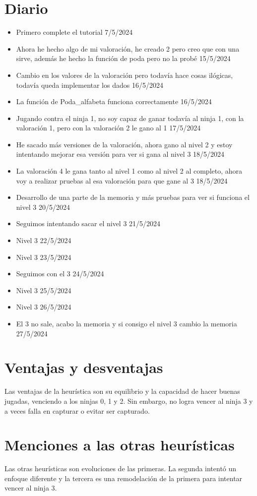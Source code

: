 \documentclass[a4paper, 11pt]{article}
\begin{document}
\section{Diario}

\begin{itemize}
  \item Primero complete el tutorial 7/5/2024
  \item Ahora he hecho algo de mi valoración, he creado 2 pero creo que con una sirve, además he hecho la función de poda pero no la probé 15/5/2024
  \item Cambio en los valores de la valoración pero todavía hace cosas ilógicas, todavía queda implementar los dados 16/5/2024
  \item La función de Poda\_alfabeta funciona correctamente 16/5/2024
  \item Jugando contra el ninja 1, no soy capaz de ganar todavía al ninja 1, con la valoración 1, pero con la valoración 2 le gano al 1 17/5/2024
  \item He sacado más versiones de la valoración, ahora gano al nivel 2 y estoy intentando mejorar esa versión para ver si gana al nivel 3 18/5/2024
  \item La valoración 4 le gana tanto al nivel 1 como al nivel 2 al completo, ahora voy a realizar pruebas al esa valoración para que gane al 3 18/5/2024
  \item Desarrollo de una parte de la memoria y más pruebas para ver si funciona el nivel 3 20/5/2024
  \item Seguimos intentando sacar el nivel 3 21/5/2024
  \item Nivel 3 22/5/2024
  \item Nivel 3 23/5/2024
  \item Seguimos con el 3 24/5/2024
  \item Nivel 3 25/5/2024
  \item Nivel 3 26/5/2024
  \item El 3 no sale, acabo la memoria y si consigo el nivel 3 cambio la memoria 27/5/2024
\end{itemize}


\section{Ventajas y desventajas}

Las ventajas de la heurística son su equilibrio y la capacidad de hacer buenas jugadas, venciendo a los ninjas 0, 1 y 2. Sin embargo, no logra vencer al ninja 3 y a veces falla en capturar o evitar ser capturado.

\section{Menciones a las otras heurísticas}

Las otras heurísticas son evoluciones de las primeras. La segunda intentó un enfoque diferente y la tercera es una remodelación de la primera para intentar vencer al ninja 3.
\end{document}
